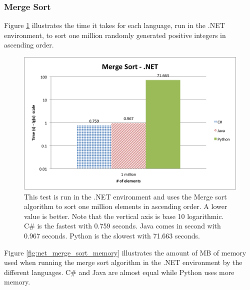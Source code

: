 \subsubsection{Merge Sort}

Figure \ref{fig:net_merge_sort} illustrates the time it takes for each language, run in the .NET environment, to sort one million randomly generated positive integers in ascending order.

\begin{figure}[h]
	\centering
	\includegraphics[width=1.0\linewidth]{chapters/new_media/MergeSortNet.png}
	\caption{This test is run in the .NET environment and uses the Merge sort algorithm to sort one million elements in ascending order. A lower value is better. Note that the vertical axis is base 10 logarithmic. C\# is the fastest with 0.759 seconds. Java comes in second with 0.967 seconds. Python is the slowest with 71.663 seconds.}
	\label{fig:net_merge_sort}
\end{figure}

Figure \ref{fig:net_merge_sort_memory} illustrates the amount of MB of memory used when running the merge sort algorithm in the .NET environment by the different languages. C\# and Java are almost equal while Python uses more memory.

